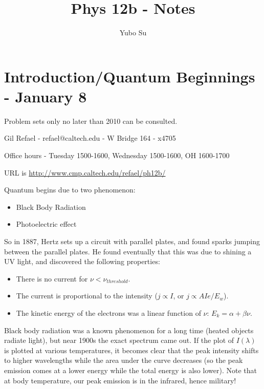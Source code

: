 \documentclass{report}
\begin{document}
\title{Phys 12b - Notes}
\author{Yubo Su}
\date{ }

\maketitle

\tableofcontents

\chapter{Introduction/Quantum Beginnings - January 8}

Problem sets only no later than 2010 can be consulted.

Gil Refael - refael@caltech.edu - W Bridge 164 - x4705

Office hours - Tuesday 1500-1600, Wednesday 1500-1600, OH 1600-1700

URL is \url{http://www.cmp.caltech.edu/refael/ph12b/}

Quantum begins due to two phenomenon:

\begin{itemize}
\item Black Body Radiation
\item Photoelectric effect
\end{itemize}

So in 1887, Hertz sets up a circuit with parallel plates, and found sparks jumping between the parallel plates. He found eventually that this was due to shining a UV light, and discovered the following properties:

\begin{itemize}
\item There is no current for $\nu < \nu_{threshold}$. 
\item The current is proportional to the intensity ($j \propto I$, or $j \propto AIe/E_w$). 
\item The kinetic energy of the electrons was a linear function of $\nu$: $E_k = \alpha + \beta\nu$.
\end{itemize}

Black body radiation was a known phenomenon for a long time (heated objects radiate light), but near 1900s the exact spectrum came out. If the plot of $I(\lambda)$ is plotted at various temperatures, it becomes clear that the peak intensity shifts to higher wavelengths while the area under the curve decreases (so the peak emission comes at a lower energy while the total energy is also lower). Note that at body temperature, our peak emission is in the infrared, hence military! 
\end{document}
